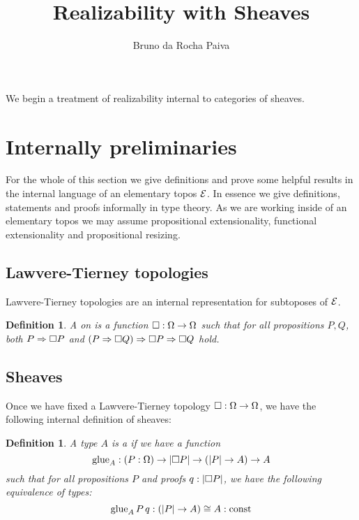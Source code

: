 \documentclass[11pt]{article}
\newtheorem{defn}[thrm]{Definition}
\begin{document}
\title{Realizability with Sheaves}
\author{Bruno da Rocha Paiva}
\maketitle

We begin a treatment of realizability internal to categories of sheaves.

\section{Internally preliminaries}

For the whole of this section we give definitions and prove some
helpful results in the internal language of an elementary topos \(\mathcal{E}\).
%
In essence we give definitions, statements and proofs informally in type theory.
%
As we are working inside of an elementary topos we may assume propositional
extensionality, functional extensionality and propositional resizing.

\subsection{Lawvere-Tierney topologies}%
\label{sub:lawvere-tierney-internal}

Lawvere-Tierney topologies are an internal representation for subtoposes
of \(\mathcal{E}\).

\begin{defn}\label{defn:lawvere-tierney}
  A  on is a function
  \(\Box : \Omega \to \Omega\) such that for all propositions \(P,Q\), both
  \({P}\Rightarrow{\Box{P}}\) and
  \({({P}\Rightarrow{\Box{Q}})}\Rightarrow{{\Box{P}}\Rightarrow{\Box{Q}}}\) hold.
\end{defn}

\subsection{Sheaves}%
\label{sub:sheaves-internal}

Once we have fixed a Lawvere-Tierney topology \(\Box : \Omega \to \Omega\),
we have the following internal definition of sheaves:

\begin{defn}
  A type \(A\) is a  if we have a function
  \[
    \text{glue}_{A} : (P : \Omega) \to |{\Box{P}}| \to (|{P}| \to A) \to A
  \]
  such that for all propositions \(P\) and proofs \(q : |{\Box{P}}|\),
  we have the following equivalence of types:
  \[
    \text{glue}_{A}\,P\,q : (|{P}| \to A) \cong A : \text{const}
  \]
\end{defn}
\end{document}
